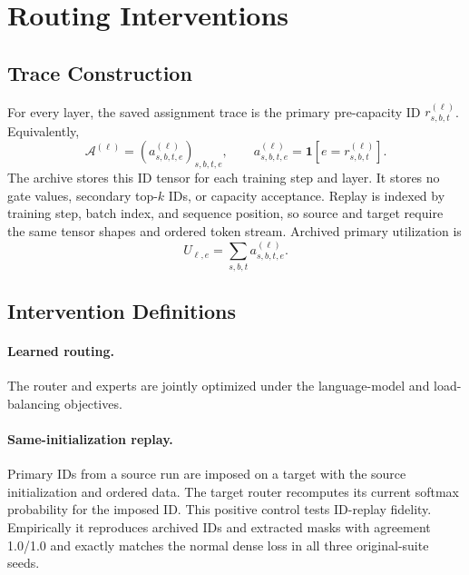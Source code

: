 \documentclass{article}
\begin{document}
\section{Routing Interventions}
\label{app:interventions}

\subsection{Trace Construction}

For every layer, the saved assignment trace is the primary pre-capacity ID
$r_{s,b,t}^{(\ell)}$. Equivalently,
\begin{equation}
\mathcal{A}^{(\ell)}
=
\left(a_{s,b,t,e}^{(\ell)}\right)_{s,b,t,e},
\qquad
a_{s,b,t,e}^{(\ell)}
=
\mathbf{1}\!\left[e=r_{s,b,t}^{(\ell)}\right].
\label{eq:app_assignment_trace}
\end{equation}
The archive stores this ID tensor for each training step and layer. It stores no
gate values, secondary top-$k$ IDs, or capacity acceptance. Replay is indexed by
training step, batch index, and sequence position, so source and target require
the same tensor shapes and ordered token stream. Archived primary utilization is
\begin{equation}
U_{\ell,e}
=
\sum_{s,b,t}a_{s,b,t,e}^{(\ell)}.
\label{eq:app_utilization}
\end{equation}

\subsection{Intervention Definitions}

\paragraph{Learned routing.}
The router and experts are jointly optimized under the language-model and
load-balancing objectives.

\paragraph{Same-initialization replay.}
Primary IDs from a source run are imposed on a target with the source
initialization and ordered data. The target router recomputes its current
softmax probability for the imposed ID. This positive control tests ID-replay
fidelity. Empirically it reproduces archived IDs and extracted masks with
agreement 1.0/1.0 and exactly matches the normal dense loss in all three
original-suite seeds.
\end{document}
